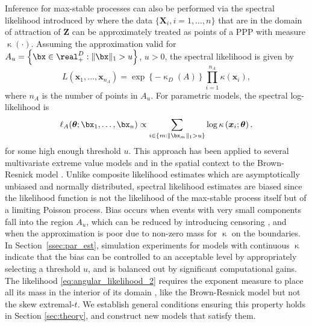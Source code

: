 \documentclass[12pt]{article}
\begin{document}
Inference for max-stable processes can also be performed via the spectral likelihood introduced by \citet{Coles.Tawn:1991} where the data $\{\bm X_i,i=1,\dots,n\}$ that are in the domain of attraction of $\bm Z$ can be approximately treated as points of a PPP with measure $\upkappa(\cdot)$. Assuming the approximation valid for $A_{u} = \left\{ \bx \in \real^D_+: \| \bx \|_1 > u\right\}$, $u>0$, the spectral likelihood is given by
%
\begin{equation}
\label{eq:angular_likelihood_1}
L(\bm x_1,\dots,\bm x_{n_{A}}) 
= \exp\left\{-\upkappa_D(A)\right\} \prod_{i=1}^{n_{A}}\kappa(\bm x_i), 
\end{equation}
%
where $n_A$ is the number of points in $A_{u}$. 
For parametric models,
the spectral log-likelihood is 
%
\begin{equation}
\label{eq:angular_likelihood_2}
\ell_A(\bm \theta;\bx_1,\dots,\bx_n) \propto 
\sum_{i \in \{m: \|\bx_m\|_1 > u\}} 
\log \kappa\left( \bm x_i;\bm \theta\right). 
\end{equation} 
%
for some high enough threshold $u$. This approach has been applied to several multivariate extreme value models \citep[see, e.g.,][]{Cooley.etal:2010,Engelke.etal:2015, Beranger.Padoan:2015, Sabourin.etal2013} and in the spatial context to the Brown-Resnick model \citep{Engelke.etal:2015}.
%
Unlike composite likelihood estimates which are asymptotically unbiased and normally distributed, spectral likelihood estimates are biased since the likelihood function is not the likelihood of the max-stable process itself but of a limiting Poisson process. 
Bias occurs when events with very small components fall into the region $A_{u}$, which can be reduced by introducing censoring \citep[see][]{Wadsworth.Tawn:2014, Thibaud.Opitz:2015}, and when the approximation is poor due to non-zero mass for $\upkappa$ on the boundaries. In Section~\ref{ssec:par_est}, simulation experiments for models with continuous $\upkappa$ indicate that the bias can be controlled to an acceptable level by appropriately selecting a threshold $u$, and is balanced out by significant computational gains. 
The likelihood \eqref{eq:angular_likelihood_2} requires the exponent measure to place all its mass in the interior of its domain \citep{Thibaud.Opitz:2015}, like the Brown-Resnick model but not the skew extremal-$t$.
We establish general conditions ensuring this property holds in Section \ref{sec:theory}, and construct new models that satisfy them. 
\end{document}
